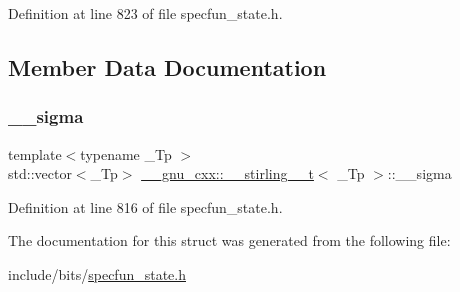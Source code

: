 Definition at line 823 of file specfun\+\_\+state.\+h.



\subsection{Member Data Documentation}
\mbox{\label{struct____gnu__cxx_1_1____stirling__1__t_ad1030ad294ff5ff3a7f433861c933d04}} 
\subsubsection{\texorpdfstring{\+\_\+\+\_\+sigma}{\_\_sigma}}
{\footnotesize\ttfamily template$<$typename \+\_\+\+Tp $>$ \\
std\+::vector$<$\+\_\+\+Tp$>$ \hyperlink{struct____gnu__cxx_1_1____stirling__1__t}{\+\_\+\+\_\+gnu\+\_\+cxx\+::\+\_\+\+\_\+stirling\+\_\+\_\+t}$<$ \+\_\+\+Tp $>$\+::\+\_\+\+\_\+sigma}



Definition at line 816 of file specfun\+\_\+state.\+h.



The documentation for this struct was generated from the following file\+:\begin{DoxyCompactItemize}
\item 
include/bits/\hyperlink{specfun__state_8h}{specfun\+\_\+state.\+h}\end{DoxyCompactItemize}
